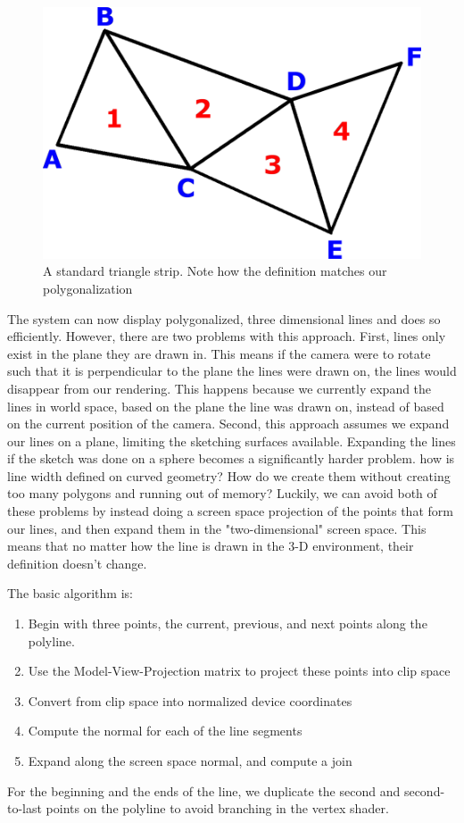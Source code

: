 \documentclass[12pt]{report}
\begin{document}
\begin{figure}
	\begin{center}
		\includegraphics[width=\textwidth]{trianglestrip.png}
	\end{center}
	\caption{A standard triangle strip. Note how the definition matches our polygonalization}
\end{figure}

The system can now display polygonalized, three dimensional lines and does so efficiently.
However, there are two problems with this approach.
First, lines only exist in the plane they are drawn in.
This means if the camera were to rotate such that it is perpendicular to the plane the lines were drawn on, the lines would disappear from our rendering.
This happens because we currently expand the lines in world space, based on the  plane the line was drawn on, instead of based on the current position of the camera.
Second, this approach assumes we expand our lines on a plane, limiting the sketching surfaces available.
Expanding the lines if the sketch was done on a sphere becomes a significantly harder problem. how is line width defined on curved geometry? 
How do we create them without creating too many polygons and running out of memory?
Luckily, we can avoid both of these problems by instead doing a screen space projection of the points that form our lines, and then expand them in the "two-dimensional" screen space.
This means that no matter how the line is drawn in the 3-D environment, their definition doesn't change.

The basic algorithm is:
\begin{enumerate}
\item Begin with three points, the current, previous, and next points along the polyline.
\item Use the Model-View-Projection matrix to project these points into clip space
\item Convert from clip space into normalized device coordinates
\item Compute the normal for each of the line segments
\item Expand along the screen space normal, and compute a join
\end{enumerate}
For the beginning and the ends of the line, we duplicate the second and second-to-last points on the polyline to avoid branching in the vertex shader. 
\end{document}
